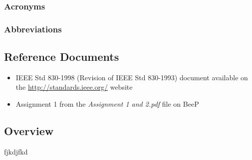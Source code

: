 		\subsubsection{Acronyms}
		\subsubsection{Abbreviations}
	\subsection{Reference Documents}
	\begin{itemize}
		\item IEEE Std 830-1998 (Revision of IEEE Std 830-1993) document available on the \url{http://standards.ieee.org/} website
		\item Assignment 1 from the \emph{Assignment 1 and 2.pdf} file on BeeP
	\end{itemize}
	\subsection{Overview}
	fjkdjfkd
	
